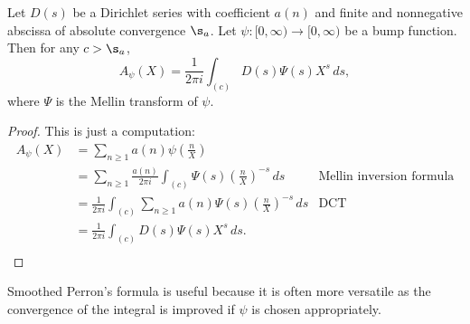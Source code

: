     \begin{theorem}
      Let $D(s)$ be a Dirichlet series with coefficient $a(n)$ and finite and nonnegative abscissa of absolute convergence $\s_{a}$. Let $\psi:[0,\infty) \to [0,\infty)$ be a bump function. Then for any $c > \s_{a}$,
      \[
        A_{\psi}(X) = \frac{1}{2\pi i}\int_{(c)}D(s)\Psi(s)X^{s}\,ds,
      \]
      where $\Psi$ is the Mellin transform of $\psi$.
    \end{theorem}
    \begin{proof}
      This is just a computation:
      \begin{align*}
        A_{\psi}(X) &= \sum_{n \ge 1}a(n)\psi\left(\frac{n}{X}\right) \\
        &= \sum_{n \ge 1}\frac{a(n)}{2\pi i}\int_{(c)}\Psi(s)\left(\frac{n}{X}\right)^{-s}\,ds & \text{Mellin inversion formula} \\
        &= \frac{1}{2\pi i}\int_{(c)}\sum_{n \ge 1}a(n)\Psi(s)\left(\frac{n}{X}\right)^{-s}\,ds & \text{DCT} \\
        &= \frac{1}{2\pi i}\int_{(c)}D(s)\Psi(s)X^{s}\,ds. \\
      \end{align*}
    \end{proof}

    Smoothed Perron's formula is useful because it is often more versatile as the convergence of the integral is improved if $\psi$ is chosen appropriately.
